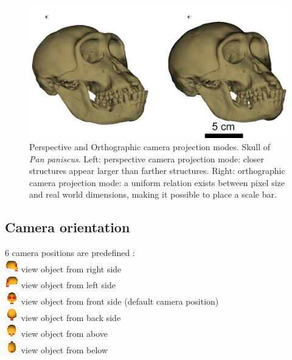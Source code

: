 \begin{figure}
  \centering
  \includegraphics[scale=0.4]{images/06/camera/camera_ortho_example.png} 
	\caption{Perspective and Orthographic camera projection modes. Skull of \textit{Pan paniscus}. Left: perspective camera projection mode: closer structures appear larger than farther structures. Right: orthographic camera projection mode: a uniform relation exists between pixel size and real world dimensions, making it possible to place a scale bar. }
\label{camera_ortho_example}
 
\end{figure}


\subsection{Camera orientation}
6 camera positions are predefined :\\
\includegraphics[scale=0.7]{images/06/camera/camera_right.png} view object from right side \\
\includegraphics[scale=0.7]{images/06/camera/camera_left.png} view object from left side\\
\includegraphics[scale=0.7]{images/06/camera/camera_front.png} view object from front side (default camera position)\\
\includegraphics[scale=0.7]{images/06/camera/camera_back.png} view object from back side\\
\includegraphics[scale=0.7]{images/06/camera/camera_above.png} view object from above\\
\includegraphics[scale=0.7]{images/06/camera/camera_below.png} view object from below\\

